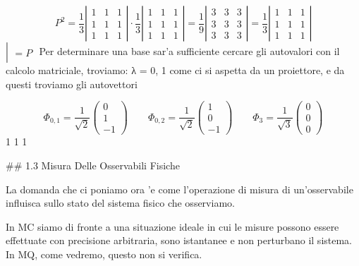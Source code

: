 {	$$P^{2}={\frac{1}{3}}\left|\begin{array}{ccc}1&1&1\\ 1&1&1\\ 1&1&1\end{array}\right|\cdot{\frac{1}{3}}\left|\begin{array}{ccc}1&1&1\\ 1&1&1\\ 1&1&1\end{array}\right|={\frac{1}{9}}\left|\begin{array}{ccc}3&3&3\\ 3&3&3\\ 3&3&3\end{array}\right|={\frac{1}{3}}\left|\begin{array}{ccc}1&1&1\\ 1&1&1\\ 1&1&1\end{array}\right|$$
	$\left|\begin{array}{l}\\ =P\\ \end{array}\right.$
	Per determinare una base sar'a sufficiente cercare gli autovalori con il calcolo matriciale, troviamo:
	λ = 0, 1 come ci si aspetta da un proiettore, e da questi troviamo gli autovettori
	
	$$\Phi_{0,1}=\frac{1}{\sqrt{2}}\left(\begin{array}{c}{{0}}\\ {{1}}\\ {{-1}}\end{array}\right)\qquad\Phi_{0,2}=\frac{1}{\sqrt{2}}\left(\begin{array}{c}{{1}}\\ {{0}}\\ {{-1}}\end{array}\right)\qquad\Phi_{3}=\frac{1}{\sqrt{3}}\left(\begin{array}{c}{{0}}\\ {{0}}\\ {{0}}\end{array}\right)$$
	1
	1
	1
	
	## 1.3 Misura Delle Osservabili Fisiche
	
	La domanda che ci poniamo ora 'e come l'operazione di misura di un'osservabile influisca sullo stato del sistema fisico che osserviamo.
	
	In MC siamo di fronte a una situazione ideale in cui le misure possono essere effettuate con precisione arbitraria, sono istantanee e non perturbano il sistema. In MQ, come vedremo, questo non si verifica.
	
}

